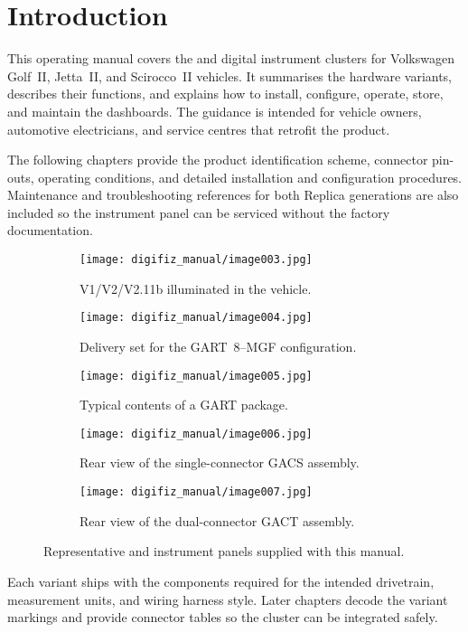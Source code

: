 \chapter{Introduction}\label{ch:introduction}

This operating manual covers the \ReplicaGenOne{} and \ReplicaNextLong{} digital instrument clusters for Volkswagen Golf~II, Jetta~II, and Scirocco~II vehicles. It summarises the hardware variants, describes their functions, and explains how to install, configure, operate, store, and maintain the dashboards. The guidance is intended for vehicle owners, automotive electricians, and service centres that retrofit the product.

The following chapters provide the product identification scheme, connector pin-outs, operating conditions, and detailed installation and configuration procedures. Maintenance and troubleshooting references for both Replica generations are also included so the instrument panel can be serviced without the factory documentation.

\begin{figure}[htbp]
    \centering
    \begin{subfigure}{0.48\textwidth}
        \texttt{[image: digifiz\_manual/image003.jpg]}
        \caption{\ReplicaGenOne{} V1/V2/V2.11b illuminated in the vehicle.}
    \end{subfigure}\hfill
    \begin{subfigure}{0.48\textwidth}
        \texttt{[image: digifiz\_manual/image004.jpg]}
        \caption{Delivery set for the GART~8--MGF configuration.}
    \end{subfigure}
    \begin{subfigure}{0.48\textwidth}
        \texttt{[image: digifiz\_manual/image005.jpg]}
        \caption{Typical contents of a GART package.}
    \end{subfigure}\hfill
    \begin{subfigure}{0.48\textwidth}
        \texttt{[image: digifiz\_manual/image006.jpg]}
        \caption{Rear view of the single-connector GACS assembly.}
    \end{subfigure}
    \begin{subfigure}{0.48\textwidth}
        \texttt{[image: digifiz\_manual/image007.jpg]}
        \caption{Rear view of the dual-connector GACT assembly.}
    \end{subfigure}
    \caption{Representative \ReplicaGenOne{} and \ReplicaNextLong{} instrument panels supplied with this manual.}
\end{figure}

Each variant ships with the components required for the intended drivetrain, measurement units, and wiring harness style. Later chapters decode the variant markings and provide connector tables so the cluster can be integrated safely.
